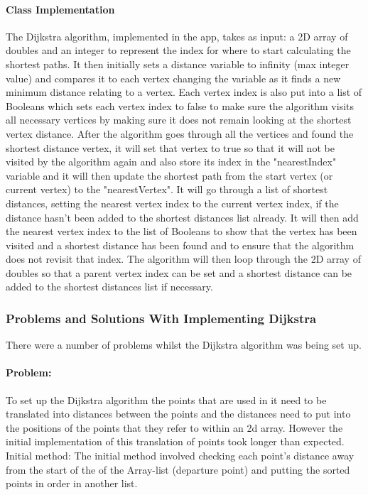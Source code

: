 \documentclass[12pt,a4paper]{article}
\begin{document}
\paragraph{Class Implementation}
The Dijkstra algorithm, implemented in the app, takes as input: a 2D array of doubles and an integer to represent the index for where to start calculating the shortest paths. It then initially sets a distance variable to infinity (max integer value) and compares it to each vertex changing the variable as it finds a new minimum distance relating to a vertex. Each vertex index is also put into a list of Booleans which sets each vertex index to false to make sure the algorithm visits all necessary vertices by making sure it does not remain looking at the shortest vertex distance. After the algorithm goes through all the vertices and found the shortest distance vertex, it will set that vertex to true so that it will not be visited by the algorithm again and also store its index in the "nearestIndex" variable and it will then update the shortest path from the start vertex (or current vertex) to the "nearestVertex". It will go through a list of shortest distances, setting the nearest vertex index to the current vertex index, if the distance hasn't been added to the shortest distances list already. It will then add the nearest vertex index to the list of Booleans to show that the vertex has been visited and a shortest distance has been found and to ensure that the algorithm does not revisit that index. The algorithm will then loop through the 2D array of doubles so that a parent vertex index can be set and a shortest distance can be added to the shortest distances list if necessary. 

\subsubsection{Problems and Solutions With Implementing Dijkstra}
There were a number of problems whilst the Dijkstra algorithm was being set up.

\paragraph{Problem:}
To set up the Dijkstra algorithm the points that are used in it need to be translated into distances between the points and the distances need to put into the positions of the points that they refer to within an 2d array. However the initial implementation of this translation of points took longer than expected.
Initial method: 
The initial method involved checking each point's distance away from the start of the of the Array-list (departure point) and putting the sorted points in order in another list. 
\end{document}
